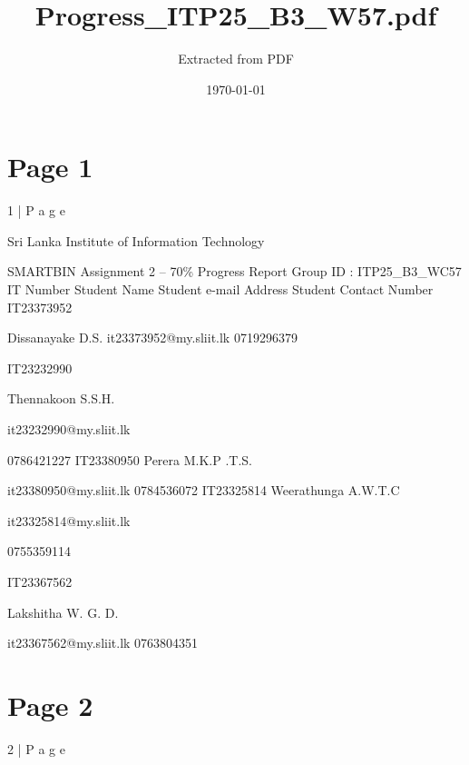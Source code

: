 \documentclass{article}
\title{Progress\_ITP25\_B3\_W57.pdf}
\author{Extracted from PDF}
\date{\today}
\begin{document}
\maketitle

\section*{Page 1}
1 | P a g e 
 
Sri Lanka Institute of Information Technology 
 
 
 
 
 
 
 
SMARTBIN 
Assignment 2 – 70\% Progress Report 
Group ID :  ITP25\_B3\_WC57 
IT Number  Student Name  Student e-mail Address  Student Contact 
Number  
IT23373952  
  
Dissanayake D.S.  it23373952@my.sliit.lk  0719296379  
  
IT23232990  
  
Thennakoon S.S.H.  
  
it23232990@my.sliit.lk  
  
0786421227  
IT23380950  Perera M.K.P .T.S.  
  
it23380950@my.sliit.lk  0784536072  
IT23325814   Weerathunga A.W.T.C  
  
it23325814@my.sliit.lk  
  
0755359114  
  
IT23367562  
  
Lakshitha W. G. D.  
  
it23367562@my.sliit.lk  0763804351  
 
 


\section*{Page 2}
2 | P a g e 
 
\end{document}
